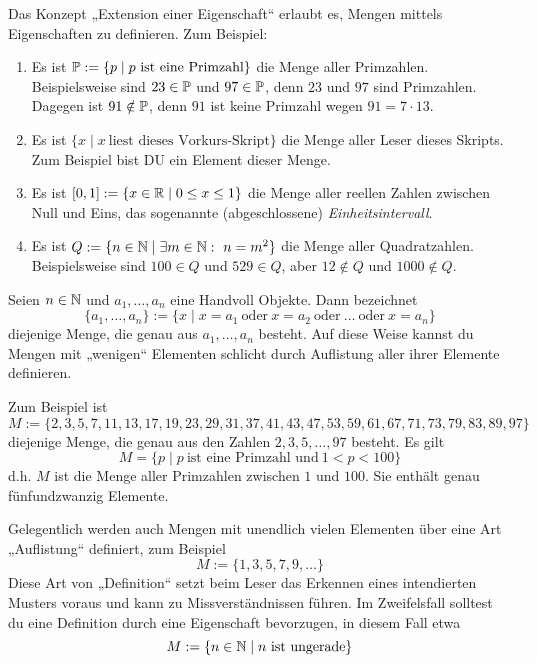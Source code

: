 \begin{bsp} \label{bsp:extension}
    Das Konzept „Extension einer Eigenschaft“ erlaubt es, Mengen mittels Eigenschaften zu definieren. Zum Beispiel:
    \begin{enumerate}
        \item Es ist $\mathbb P := \{p\mid p\ \text{ist eine Primzahl}\}$ die Menge aller Primzahlen. Beispielsweise sind $23\in \mathbb P$ und $97\in\mathbb P$, denn $23$ und $97$ sind Primzahlen. Dagegen ist $91\notin \mathbb P$, denn $91$ ist keine Primzahl wegen $91=7\cdot 13$.
        \item Es ist $\{ x\mid x\ \text{liest dieses Vorkurs-Skript} \}$ die Menge aller Leser dieses Skripts. Zum Beispiel bist DU ein Element dieser Menge.
        \item Es ist $[0,1] := \{ x\in \mathbb R \mid 0\le x\le 1\}$ die Menge aller reellen Zahlen zwischen Null und Eins, das sogenannte (abgeschlossene) \emph{Einheitsintervall}.
        \item Es ist $Q:=\{ n\in \mathbb N \mid \exists m\in \mathbb N:\ n=m^2 \}$ die Menge aller Quadratzahlen. Beispielsweise sind $100\in Q$ und $529\in Q$, aber $12\notin Q$ und $1000\notin Q$.
    \end{enumerate}
\end{bsp}


\begin{nota} \label{auflistung}
    Seien $n\in \mathbb N$ und $a_1,\dots , a_n$ eine Handvoll Objekte. Dann bezeichnet
        \[ \{a_1,\dots , a_n\} := \{ x\mid x=a_1\ \text{oder}\ x=a_2\ \text{oder}\ \ldots\ \text{oder}\ x=a_n \} \]
    diejenige Menge, die genau aus $a_1,\dots , a_n$ besteht. Auf diese Weise kannst du Mengen mit „wenigen“ Elementen schlicht durch Auflistung aller ihrer Elemente definieren.
\end{nota}


\begin{bsp}
    Zum Beispiel ist
        \[ M:=\{2,3,5,7,11,13,17,19,23,29,31,37,41,43,47,53,59,61,67,71,73,79,83,89,97\} \]
    diejenige Menge, die genau aus den Zahlen $2,3,5,\dots , 97$ besteht. Es gilt
        \[ M = \{p\mid p\ \text{ist eine Primzahl und}\ 1< p <100 \} \]
    d.h. $M$ ist die Menge aller Primzahlen zwischen $1$ und $100$. Sie enthält genau fünfundzwanzig Elemente.
\end{bsp}


\begin{bem}
    Gelegentlich werden auch Mengen mit unendlich vielen Elementen über eine Art „Auflistung“ definiert, zum Beispiel
        \[ M := \{1, 3, 5, 7, 9,\ldots \} \]
    Diese Art von „Definition“ setzt beim Leser das Erkennen eines intendierten Musters voraus und kann zu Missverständnissen führen. Im Zweifelsfall solltest du eine Definition durch eine Eigenschaft bevorzugen, in diesem Fall etwa
        \[ M := \{n \in \mathbb N \mid n\ \text{ist ungerade} \} \]
\end{bem}


